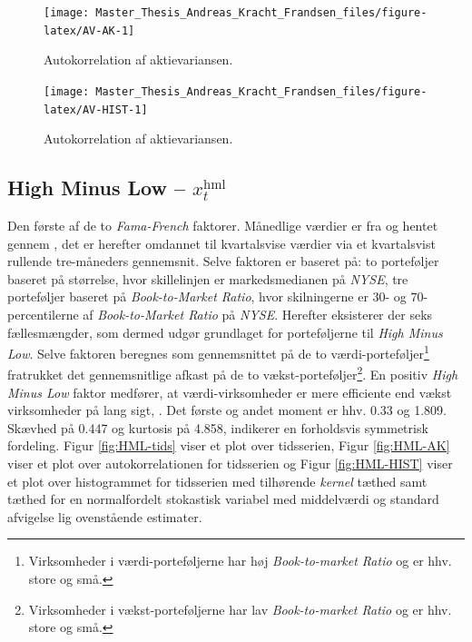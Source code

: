 \documentclass[
  a4paper,
  oneside]{memoir}
\begin{document}
\begin{figure}[htbp!]

{\centering \texttt{[image: Master\_Thesis\_Andreas\_Kracht\_Frandsen\_files/figure-latex/AV-AK-1]} 

}

\caption{Autokorrelation af aktievariansen.}\label{fig:AV-AK}
\end{figure}

\begin{figure}[htbp!]

{\centering \texttt{[image: Master\_Thesis\_Andreas\_Kracht\_Frandsen\_files/figure-latex/AV-HIST-1]} 

}

\caption{Autokorrelation af aktievariansen.}\label{fig:AV-HIST}
\end{figure}

\hypertarget{datahml}{%
\subsection{\texorpdfstring{High Minus Low -- \(x_t^{\text{hml}}\)}{High Minus Low -- x\_t\^{}\{\textbackslash text\{hml\}\}}}\label{datahml}}

Den første af de to \emph{Fama-French} faktorer. Månedlige værdier er fra \citep{CRSPakt} og hentet gennem \citep{French2020}, det er herefter omdannet til kvartalsvise værdier via et kvartalsvist rullende tre-måneders gennemsnit. Selve faktoren er baseret på: to porteføljer baseret på størrelse, hvor skillelinjen er markedsmedianen på \emph{NYSE}, tre porteføljer baseret på \emph{Book-to-Market Ratio}, hvor skilningerne er \(30\)- og \(70\)-percentilerne af \emph{Book-to-Market Ratio} på \emph{NYSE}. Herefter eksisterer der seks fællesmængder, som dermed udgør grundlaget for porteføljerne til \emph{High Minus Low}. Selve faktoren beregnes som gennemsnittet på de to værdi-porteføljer\footnote{Virksomheder i værdi-porteføljerne har høj \emph{Book-to-market Ratio} og er hhv. store og små.} fratrukket det gennemsnitlige afkast på de to vækst-porteføljer\footnote{Virksomheder i vækst-porteføljerne har lav \emph{Book-to-market Ratio} og er hhv. store og små.}. En positiv \emph{High Minus Low} faktor medfører, at værdi-virksomheder er mere efficiente end vækst virksomheder på lang sigt, \citep{French1993}. Det første og andet moment er hhv. 0.33 og 1.809. Skævhed på 0.447 og kurtosis på 4.858, indikerer en forholdsvis symmetrisk fordeling. Figur \ref{fig:HML-tids} viser et plot over tidsserien, Figur \ref{fig:HML-AK} viser et plot over autokorrelationen for tidsserien og Figur \ref{fig:HML-HIST} viser et plot over histogrammet for tidsserien med tilhørende \emph{kernel} tæthed samt tæthed for en normalfordelt stokastisk variabel med middelværdi og standard afvigelse lig ovenstående estimater.
\end{document}
